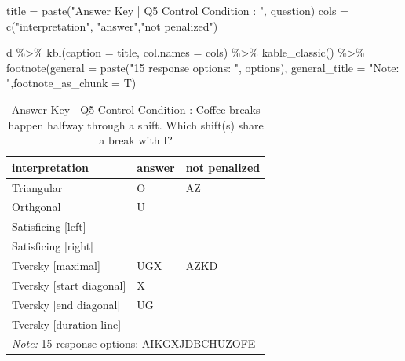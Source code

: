 \documentclass[
  letterpaper,
  DIV=11,
  numbers=noendperiod]{scrreprt}
\newenvironment{Shaded}{\begin{snugshade}}{\end{snugshade}}
\newcommand{\AttributeTok}[1]{\textcolor[rgb]{0.40,0.45,0.13}{#1}}
\newcommand{\FunctionTok}[1]{\textcolor[rgb]{0.28,0.35,0.67}{#1}}
\newcommand{\NormalTok}[1]{\textcolor[rgb]{0.00,0.23,0.31}{#1}}
\newcommand{\OtherTok}[1]{\textcolor[rgb]{0.00,0.23,0.31}{#1}}
\newcommand{\SpecialCharTok}[1]{\textcolor[rgb]{0.37,0.37,0.37}{#1}}
\newcommand{\StringTok}[1]{\textcolor[rgb]{0.13,0.47,0.30}{#1}}
\begin{document}
\begin{Shaded}
\begin{Highlighting}[]
\NormalTok{title }\OtherTok{=} \FunctionTok{paste}\NormalTok{(}\StringTok{"Answer Key | Q5 Control Condition : "}\NormalTok{, question)}
\NormalTok{cols }\OtherTok{=} \FunctionTok{c}\NormalTok{(}\StringTok{"interpretation"}\NormalTok{, }\StringTok{"answer"}\NormalTok{,}\StringTok{"not penalized"}\NormalTok{)}

\NormalTok{d }\SpecialCharTok{\%\textgreater{}\%} \FunctionTok{kbl}\NormalTok{(}\AttributeTok{caption =}\NormalTok{ title, }\AttributeTok{col.names =}\NormalTok{ cols) }\SpecialCharTok{\%\textgreater{}\%} \FunctionTok{kable\_classic}\NormalTok{() }\SpecialCharTok{\%\textgreater{}\%} 
  \FunctionTok{footnote}\NormalTok{(}\AttributeTok{general =} \FunctionTok{paste}\NormalTok{(}\StringTok{"15 response options: "}\NormalTok{, options), }\AttributeTok{general\_title =} \StringTok{"Note: "}\NormalTok{,}\AttributeTok{footnote\_as\_chunk =}\NormalTok{ T) }
\end{Highlighting}
\end{Shaded}

\begin{table}

\caption{Answer Key | Q5 Control Condition :  Coffee breaks happen halfway through a shift. Which shift(s) share a break with I?}
\centering
\begin{tabular}[t]{l|l|l}
\hline
interpretation & answer & not penalized\\
\hline
Triangular & O & AZ\\
\hline
Orthgonal & U & \\
\hline
Satisficing [left] &  & \\
\hline
Satisficing [right] &  & \\
\hline
Tversky [maximal] & UGX & AZKD\\
\hline
Tversky [start diagonal] & X & \\
\hline
Tversky [end diagonal] & UG & \\
\hline
Tversky [duration line] &  & \\
\hline
\multicolumn{3}{l}{\rule{0pt}{1em}\textit{Note: } 15 response options:  AIKGXJDBCHUZOFE}\\
\end{tabular}
\end{table}
\end{document}
